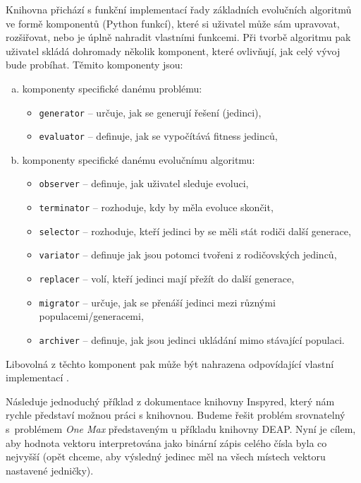 Knihovna přichází s funkční implementací řady základních 
evolučních algoritmů ve formě komponentů (Python funkcí), které si uživatel
může sám upravovat, rozšiřovat, nebo je úplně nahradit vlastními funkcemi. Při
tvorbě algoritmu pak uživatel skládá dohromady několik komponent, které
ovlivňují, jak celý vývoj bude probíhat.
Těmito komponenty jsou:
\begin{enumerate}[a)]
    \item komponenty specifické danému problému:
        \begin{itemize}
            \item \texttt{generator} -- určuje, jak se generují řešení
                (jedinci),
            \item \texttt{evaluator} -- definuje, jak se vypočítává fitness
                jedinců,
        \end{itemize}
    \item komponenty specifické danému evolučnímu algoritmu:
        \begin{itemize}
            \item \texttt{observer} -- definuje, jak uživatel sleduje evoluci,
            \item \texttt{terminator} -- rozhoduje, kdy by měla evoluce
                skončit,
            \item \texttt{selector} -- rozhoduje, kteří jedinci by se měli stát
                rodiči další generace,
            \item \texttt{variator} -- definuje jak jsou potomci tvořeni z
                rodičovských jedinců,
            \item \texttt{replacer} -- volí, kteří jedinci mají přežít do další
                generace,
            \item \texttt{migrator} -- určuje, jak se přenáší jedinci mezi
                různými \\populacemi/generacemi,
            \item \texttt{archiver} -- definuje, jak jsou jedinci ukládání mimo
                stávající populaci.
        \end{itemize}
\end{enumerate}

Libovolná z těchto komponent pak může být nahrazena odpovídající vlastní
implementací \citep{tonda2020inspyred}.

Následuje jednoduchý příklad z dokumentace knihovny Inspyred, který nám rychle
představí možnou práci s knihovnou. Budeme řešit problém srovnatelný
s~problémem \emph{One Max} představeným u příkladu knihovny DEAP. Nyní je
cílem, aby hodnota vektoru interpretována jako binární zápis celého čísla byla
co nejvyšší (opět chceme, aby výsledný jedinec měl na všech místech vektoru
nastavené jedničky). 

